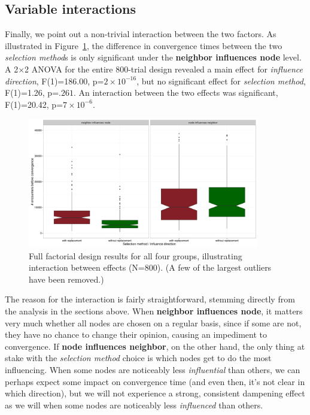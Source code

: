 \subsection{Variable interactions}

Finally, we point out a non-trivial interaction between the two factors. As
illustrated in Figure~\ref{interactionBoxplot}, the difference in convergence
times between the two \textsl{selection method}s is only significant under the
\textbf{neighbor influences node} level. A 2$\times$2 ANOVA for the entire
800-trial design revealed a main effect for \textsl{influence direction},
F(1)=186.00, p=$2\times 10^{-16}$, but no significant effect for
\textsl{selection method}, F(1)=1.26, p=$.261$. An interaction between the two
effects was significant, F(1)=20.42, p=$7\times 10^{-6}$.

\begin{figure}[ht]
\centering
\includegraphics[width=0.9\textwidth]{interactionBoxplot.pdf} 
\caption{Full factorial design results for all four groups, illustrating
interaction between effects (N=800). (A few of the largest outliers have been
removed.)}
\label{interactionBoxplot}
\end{figure}

The reason for the interaction is fairly straightforward, stemming directly
from the analysis in the sections above. When \textbf{neighbor influences
node}, it matters very much whether all nodes are chosen on a regular basis,
since if some are not, they have no chance to change their opinion, causing an
impediment to convergence. If \textbf{node influences neighbor}, on the other
hand, the only thing at stake with the \textsl{selection method} choice is
which nodes get to do the most influencing. When some nodes are noticeably
less \textit{influential} than others, we can perhaps expect some impact on
convergence time (and even then, it's not clear in which direction), but we
will not experience a strong, consistent dampening effect as we will when some
nodes are noticeably less \textit{influenced} than others.

